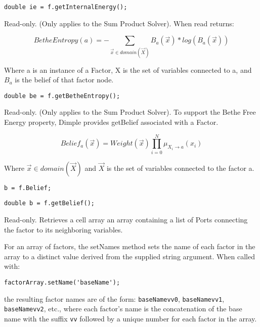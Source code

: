 \ifjava
\begin{lstlisting}
double ie = f.getInternalEnergy();
\end{lstlisting}
\fi

\label{sec:Factor.BetheEntropy}

Read-only.  (Only applies to the Sum Product Solver).  When read returns:

\[
BetheEntropy(a) = - \sum_{\vec{x} \in domain(\vec{X})}B_a(\vec{x})*log(B_a(\vec{x})) 
\]

Where a is an instance of a Factor, X is the set of variables connected to a, and $B_a$ is the belief of that factor node.
\ifmatlab
\begin{lstlisting}
double be = f.getBetheEntropy();
\end{lstlisting}
\fi

\label{sec:Factor.Belief}

Read-only.  (Only applies to the Sum Product Solver). To support the Bethe Free Energy property, Dimple provides getBelief associated with a Factor.

\[
Belief_a(\vec{x}) = Weight(\vec{x})\prod_{i=0}^N \mu_{X_i \rightarrow a}(x_i)
\]

Where $ \vec{x} \in domain(\vec{X}) $ and $ \vec{X} $ is the set of variables connected to the factor a.

\ifmatlab
\begin{lstlisting}
b = f.Belief;
\end{lstlisting}
\fi
\ifjava
\begin{lstlisting}
double b = f.getBelief();
\end{lstlisting}
\fi



Read-only.  Retrieves \ifmatlab a cell array \fi \ifjava an array \fi containing a list of Ports connecting the factor to its neighboring variables.


\ifmatlab
{}

\label{sec:Factor.setNames}

For an array of factors, the setNames method sets the name of each factor in the array to a distinct value derived from the supplied string argument.  When called with:

\begin{lstlisting}
factorArray.setName('baseName');
\end{lstlisting}

the resulting factor names are of the form: \texttt{baseName\textunderscore vv0}, \texttt{baseName\textunderscore vv1}, \texttt{baseName\textunderscore vv2}, etc., where each factor's name is the concatenation of the base name with the suffix \texttt{\textunderscore vv} followed by a unique number for each factor in the array.


